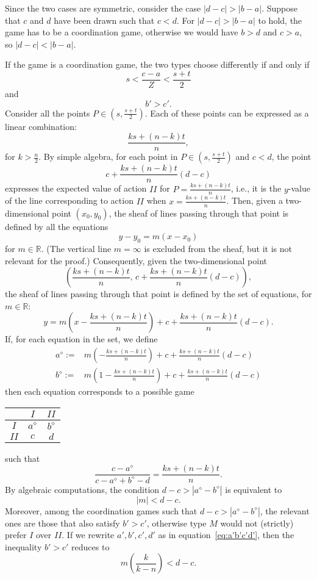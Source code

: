\documentclass[fleqn,reqno,12pt]{article}
\theoremstyle{Satz}
\theoremstyle{Bsp}
\begin{document}
Since the two cases are symmetric, consider the case $|d-c|>|b-a|$.
Suppose that $c$ and $d$ have been drawn such that $c<d$. For $|d-c|>|b-a|$
to hold, the game has to be a coordination game, otherwise we would
have $b>d$ and $c>a$, so $|d-c|<|b-a|$. 

If the game is a coordination game, the two types choose differently
if and only if
\[
s<\frac{c-a}{Z}<\frac{s+t}{2}
\]
and
\[
b'>c'.
\]
Consider all the points $P\in(s,\frac{s+t}{2})$. Each of these points
can be expressed as a linear combination:
\[
\frac{ks+(n-k)t}{n},
\]
for $k>\frac{n}{2}$. By simple algebra, for each point in $P\in(s,\frac{s+t}{2})$
and $c<d$, the point 
\[
c+\frac{ks+(n-k)t}{n}(d-c)
\]
expresses the expected value of action $II$ for $P=\frac{ks+(n-k)t}{n}$,
i.e., it is the $y$-value of the line corresponding to action $II$
when $x=\frac{ks+(n-k)t}{n}$. Then, given a two-dimensional point
$(x_{0},y_{0})$, the sheaf of lines passing through that point is
defined by all the equations 
\[
y-y_{0}=m(x-x_{0})
\]
for $m\in\mathbb{R}$. (The vertical line $m=\infty$ is excluded
from the sheaf, but it is not relevant for the proof.) Consequently,
given the two-dimensional point 
\[
\left(\frac{ks+(n-k)t}{n},\, c+\frac{ks+(n-k)t}{n}(d-c)\right),
\]
the sheaf of lines passing through that point is defined by the set
of equations, for $m\in\mathbb{R}$: 
\[
y=m\left(x-\frac{ks+(n-k)t}{n}\right)+c+\frac{ks+(n-k)t}{n}(d-c).
\]
If, for each equation in the set, we define 
\begin{equation}
\begin{array}{cc}
a^{\diamond}:= & m\left(-\frac{ks+(n-k)t}{n}\right)+c+\frac{ks+(n-k)t}{n}(d-c)\\
b^{\diamond}:= & m\left(1-\frac{ks+(n-k)t}{n}\right)+c+\frac{ks+(n-k)t}{n}(d-c)
\end{array}\label{eq:a-b-1}
\end{equation}
then each equation corresponds to a possible game\medskip{}


\hfill{}%
\begin{tabular}{|c|c|c|}
\cline{2-3} 
\multicolumn{1}{c|}{} & $I$ & $II$\tabularnewline
\hline 
$I$ & $a^{\diamond}$ & $b^{\diamond}$\tabularnewline
\hline 
$II$ & $c$ & $d$\tabularnewline
\hline 
\end{tabular}\hfill{}

\medskip{}
such that
\[
\frac{c-a^{\diamond}}{c-a^{\diamond}+b^{\diamond}-d}=\frac{ks+(n-k)t}{n}.
\]
By algebraic computations, the condition $d-c>|a^{\diamond}-b^{\diamond}|$
is equivalent to 
\[
|m|<d-c.
\]
Moreover, among the coordination games such that $d-c>|a^{\diamond}-b^{\diamond}|$,
the relevant ones are those that also satisfy $b'>c'$, otherwise
type $M$ would not (strictly) prefer $I$ over $II$. If we rewrite
$a',b',c',d'$ as in equation~\ref{eq:a'b'c'd'}, then the inequality
$b'>c'$ reduces to 
\[
m\left(\frac{k}{k-n}\right)<d-c.
\]
\end{document}
